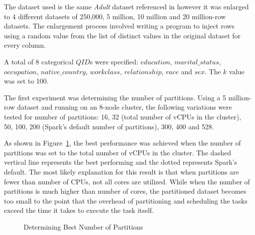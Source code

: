 \documentclass[11pt]{article}       %
\begin{document}
The dataset used is the same \emph{Adult} dataset referenced in \cite{Sopaoglu:2017} however it was enlarged to 4 different datasets of 250,000, 5 million, 10 million and 20 million-row datasets. The enlargement process involved writing a program to inject rows using a random value from the list of distinct values in the original dataset for every column.

A total of 8 categorical $QID$s were specified: $education$, $marital\_status$, $occupation$, $native\_country$, $workclass$, $relationship$, $race$ and $sex$. The $k$ value was set to 100.

The first experiment was determining the number of partitions. Using a 5 million-row dataset and running on an 8-node cluster, the following variations were tested for number of partitions: 16, 32 (total number of vCPUs in the cluster), 50, 100, 200 (Spark's default number of partitions), 300, 400 and 528.

As shown in Figure~\ref{bestPartition}, the best performance was achieved when the number of partitions was set to the total number of vCPUs in the cluster. The dashed vertical line represents the best performing and the dotted represents Spark's default. The most likely explanation for this result is that when partitions are fewer than number of CPUs, not all cores are utilized. While when the number of partitions is much higher than number of cores, the partitioned dataset becomes too small to the point that the overhead of partitioning and scheduling the tasks exceed the time it takes to execute the task itself.

\begin{figure}[h]
\centering
{}
\caption{Determining Best Number of Partitions}
\label{bestPartition}
\end{figure}
\end{document}
